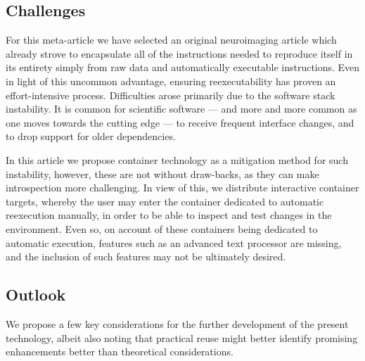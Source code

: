\subsection{Challenges}
For this meta-article we have selected an original neuroimaging article which already strove to encapsulate all of the instructions needed to reproduce itself in its entirety simply from raw data and automatically executable instructions.
Even in light of this uncommon advantage, ensuring reexecutability has proven an effort-intensive process.
Difficulties arose primarily due to the software stack instability.
It is common for scientific software — and more and more common as one moves towards the cutting edge — to receive frequent interface changes, and to drop support for older dependencies.

In this article we propose container technology as a mitigation method for such instability, however, these are not without draw-backs, as they can make introspection more challenging.
In view of this, we distribute interactive container targets, whereby the user may enter the container dedicated to automatic reexecution manually, in order to be able to inspect and test changes in the environment.
Even so, on account of these containers being dedicated to automatic execution, features such as an advanced text processor are missing, and the inclusion of such features may not be ultimately desired.


\subsection{Outlook}

We propose a few key considerations for the further development of the present technology, albeit also noting that practical reuse might better identify promising enhancements better than theoretical considerations.

